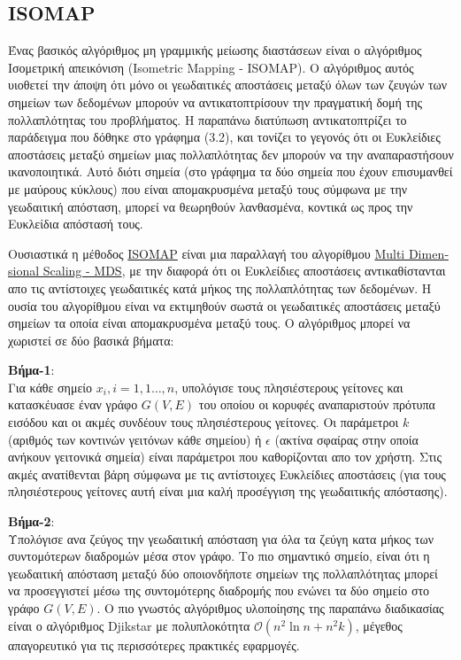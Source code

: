 \subsection{\textlatin{ISOMAP}}
\par
Ένας βασικός αλγόριθμος μη γραμμικής μείωσης διαστάσεων είναι ο αλγόριθμος Ισομετρική απεικόνιση \textlatin{(Isometric Mapping - ISOMAP)}\textlatin{\cite{isomap}}. Ο αλγόριθμος αυτός υιοθετεί την άποψη ότι μόνο οι γεωδαιτικές αποστάσεις μεταξύ όλων των ζευγών των σημείων των δεδομένων μπορούν να αντικατοπτρίσουν την πραγματική δομή της πολλαπλότητας του προβλήματος. Η παραπάνω διατύπωση αντικατοπτρίζει το παράδειγμα που δόθηκε στο γράφημα (3.2), και τονίζει το γεγονός ότι οι Ευκλείδιες αποστάσεις μεταξύ σημείων μιας πολλαπλότητας δεν μπορούν να την αναπαραστήσουν ικανοποιητικά. Αυτό διότι σημεία (στο γράφημα τα δύο σημεία που έχουν επισυμανθεί με μαύρους κύκλους) που είναι απομακρυσμένα μεταξύ τους σύμφωνα με την γεωδαιτική απόσταση, μπορεί να θεωρηθούν λανθασμένα, κοντικά ως προς την Ευκλείδια απόστασή τους.
\par
Ουσιαστικά η μέθοδος \href{http://isomap.stanford.edu/}{\textlatin{ISOMAP}}\textlatin{\cite{isomap}} είναι μια παραλλαγή του αλγορίθμου \href{https://en.wikipedia.org/wiki/Multidimensional_scaling}{\textlatin{Multi Dimensional Scaling - MDS}}\textlatin{\cite{mds}}, με την διαφορά ότι οι Ευκλείδιες αποστάσεις αντικαθίστανται απο τις αντίστοιχες γεωδαιτικές κατά μήκος της πολλαπλότητας των δεδομένων. Η ουσία του αλγορίθμου είναι να εκτιμηθούν σωστά οι γεωδαιτικές αποστάσεις μεταξύ σημείων τα οποία είναι απομακρυσμένα μεταξύ τους. Ο αλγόριθμος μπορεί να χωριστεί σε δύο βασικά βήματα:
\par
\textbf{Βήμα-1}: \\ Για κάθε σημείο $x_{i},i=1,1\ldots,n$, υπολόγισε τους πλησιέστερους γείτονες και κατασκέυασε έναν γράφο $G(V,E)$ του οποίου οι κορυφές αναπαριστούν πρότυπα εισόδου και οι ακμές συνδέουν τους πλησιέστερους γείτονες. Οι παράμετροι $k$ (αριθμός των κοντινών γειτόνων κάθε σημείου) ή $\epsilon$ (ακτίνα σφαίρας στην οποία ανήκουν γειτονικά σημεία) είναι παράμετροι που καθορίζονται απο τον χρήστη. Στις ακμές ανατίθενται βάρη σύμφωνα με τις αντίστοιχες Ευκλείδιες αποστάσεις (για τους πλησιέστερους γείτονες αυτή είναι μια καλή προσέγγιση της γεωδαιτικής απόστασης).
\par
\textbf{Βήμα-2}: \\ Υπολόγισε ανα ζεύγος την γεωδαιτική απόσταση για όλα τα ζεύγη κατα μήκος των συντομότερων διαδρομών μέσα στον γράφο. Το πιο σημαντικό σημείο, είναι ότι η γεωδαιτική απόσταση μεταξύ δύο οποιονδήποτε σημείων της πολλαπλότητας μπορεί να προσεγγιστεί μέσω της συντομότερης διαδρομής που ενώνει τα δύο σημείο στο γράφο $G(V,E)$. Ο πιο γνωστός αλγόριθμος υλοποίησης της παραπάνω διαδικασίας είναι ο αλγόριθμος \textlatin{Djikstar} με πολυπλοκότητα $\mathcal{O}(n^{2}\ln n + n^{2}k)$, μέγεθος απαγορευτικό για τις περισσότερες πρακτικές εφαρμογές.
